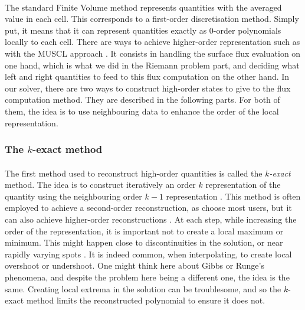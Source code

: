       \paragraph{}
      The standard Finite Volume method represents quantities with the averaged value in each cell.
      This corresponds to a first-order discretisation method.
      Simply put, it means that it can represent quantities exactly as 0-order polynomials locally to each cell.
      There are ways to achieve higher-order representation such as with the MUSCL approach \cite{VanLeer1979}.
      It consists in handling the surface flux evaluation on one hand, which is what we did in the Riemann problem part, and deciding what left and right quantities to feed to this flux computation on the other hand.
      In our solver, there are two ways to construct high-order states to give to the flux computation method.
      They are described in the following parts.
      For both of them, the idea is to use neighbouring data to enhance the order of the local representation.


      \subsubsection{The $k$-exact method}

        \paragraph{}
        The first method used to reconstruct high-order quantities is called the \emph{$k$-exact} method.
        The idea is to construct iteratively an order $k$ representation of the quantity using the neighbouring order $k-1$ representation \cite{HaiderCroisilleCourbet2009}.
        This method is often employed to achieve a second-order reconstruction, as choose most users, but it can also achieve higher-order reconstructions \cite{HaiderCroisilleCourbet2011, HaiderCourbetCroisille2018, PontBrennerCinellaEtAl2017}.
        At each step, while increasing the order of the representation, it is important not to create a local maximum or minimum.
        This might happen close to discontinuities in the solution, or near rapidly varying spots .
        It is indeed common, when interpolating, to create local overshoot or undershoot.
        One might think here about Gibbs or Runge's phenomena, and despite the problem here being a different one, the idea is the same.
        Creating local extrema in the solution can be troublesome, and so the $k$-exact method limits the reconstructed polynomial to ensure it does not.


